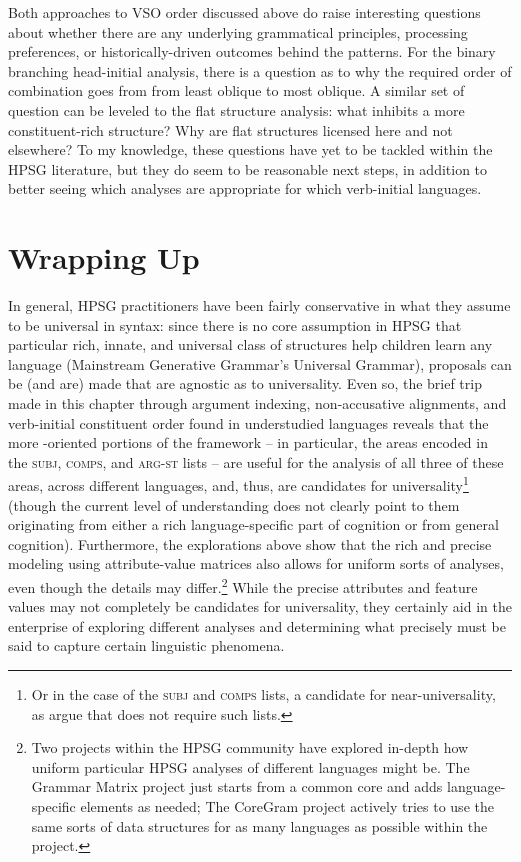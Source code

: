 \documentclass[output=paper
	        ,collection
	        ,collectionchapter
 	        ,biblatex
                ,babelshorthands
                ,newtxmath
                ,draftmode
                ,colorlinks, citecolor=brown
]{langscibook}
\begin{document}
Both approaches to VSO order discussed above do raise interesting questions about whether there are any underlying grammatical principles, processing preferences, or historically-driven outcomes behind the patterns. For the binary branching head-initial analysis, there is a question as to why the required order of combination goes from from least oblique to most oblique. A similar set of question can be leveled to the flat structure analysis: what inhibits a more constituent-rich structure? Why are flat structures licensed here and not elsewhere? To my knowledge, these questions have yet to be tackled within the HPSG literature, but they do seem to be reasonable next steps, in addition to better seeing which analyses are appropriate for which verb-initial languages. 
	
\section{Wrapping Up}

In general, HPSG practitioners have been fairly conservative in what they assume to be universal in syntax: since there is no core assumption in HPSG that particular rich, innate, and universal class of structures help children learn any language (Mainstream Generative Grammar's Universal Grammar), proposals can be (and are) made that are agnostic as to universality. Even so, the brief trip made in this chapter through argument indexing, non-accusative alignments, and verb-initial constituent order found in understudied languages reveals that the more -oriented portions of the framework -- in particular, the areas encoded in the \textsc{subj}, \textsc{comps}, and \textsc{arg-st} lists -- are useful for the analysis of all three of these areas, across different languages, and, thus, are candidates for universality\footnote{Or in the case of the \textsc{subj} and \textsc{comps} lists, a candidate for near-universality, as \cite{KM15} argue that  does not require such lists.} (though the current level of understanding does not clearly point to them originating from either a rich language-specific part of cognition or from general cognition). Furthermore, the explorations above show that the rich and precise modeling using attribute-value matrices also allows for uniform sorts of analyses, even though the details may differ.\footnote{Two projects within the HPSG community have explored in-depth how uniform particular HPSG analyses of different languages might be. The Grammar Matrix project \citep{BDFPS2010a-u} just starts from a common core and adds language-specific elements as needed; The CoreGram project \citep{MuellerCoreGram} actively tries to use the same sorts of data structures for as many languages as possible within the project.} While the precise attributes and feature values may not completely be candidates for universality, they certainly aid in the enterprise of exploring different analyses and determining what precisely must be said to capture certain linguistic phenomena. 
\end{document}
